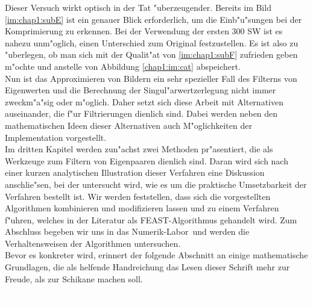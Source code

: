 Dieser Versuch wirkt optisch in der Tat "uberzeugender. Bereits im Bild \ref{im:chap1:subE} ist ein genauer Blick erforderlich, um die Einb"u"sungen bei der Komprimierung zu erkennen.
Bei der Verwendung der ersten 300 SW ist es nahezu unm"oglich, einen Unterschied zum Original festzustellen.
Es ist also zu "uberlegen, ob man sich mit der Qualit"at von \ref{im:chap1:subF} zufrieden geben m"ochte und anstelle von Abbildung \ref{chap1:im:cat} abspeichert.\\

Nun ist das Approximieren von Bildern ein sehr spezieller Fall des Filterns von Eigenwerten und die Berechnung der Singul"arwertzerlegung nicht immer zweckm"a"sig oder m"oglich.
Daher setzt sich diese Arbeit mit Alternativen auseinander, die f"ur Filtrierungen dienlich sind. Dabei werden neben den mathematischen Ideen dieser Alternativen auch M"oglichkeiten der Implementation vorgestellt.\\

Im dritten Kapitel werden zun"achst zwei Methoden pr"asentiert, die als Werkzeuge zum Filtern von Eigenpaaren dienlich sind.
Daran wird sich nach einer kurzen analytischen Illustration dieser Verfahren eine Diskussion anschlie"sen, bei der untersucht wird, wie es um die praktische Umsetzbarkeit der Verfahren bestellt ist.
Wir werden feststellen, dass sich die vorgestellten Algorithmen kombinieren und modifizieren lassen und zu einem Verfahren f"uhren, welches in der Literatur als FEAST-Algorithmus gehandelt wird. Zum Abschluss begeben wir uns in das \glqq Numerik-Labor\grqq\ und werden die Verhaltensweisen der Algorithmen untersuchen.\\

Bevor es konkreter wird, erinnert der folgende Abschnitt an einige mathematische Grundlagen, die als helfende Handreichung das Lesen dieser Schrift mehr zur Freude, als zur Schikane machen soll.

\newpage
\textcolor{white}{bla}
